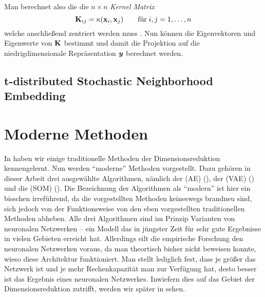 Man berechnet also die die $n \times n$ \textit{Kernel Matrix}
\begin{equation}
	\mathbf{K}_{ij} = \kappa(\mathbf{x}_i, \mathbf{x}_j) \qquad \text{für}\; i,j = 1,\ldots,n
\end{equation}
welche anschließend zentriert werden muss \parencite[598]{Bishop.2006}.
Nun können die Eigenvektoren und Eigenwerte von $\mathbf{K}$ bestimmt und damit die Projektion auf die niedrigdimensionale Repräsentation $\bm{y}$ berechnet werden.







\subsection{t-distributed Stochastic Neighborhood Embedding}
\label{ch:MethodenDerDimRed:traditionell:t-SNE}

\newpage

\section{Moderne Methoden}
\label{ch:MethodenDerDimRed:modern}
In  haben wir einige traditionelle Methoden der Dimensionsreduktion kennengelernt. Nun werden \enquote{moderne} Methoden vorgestellt. Dazu gehören in dieser Arbeit drei ausgewählte Algorithmen, nämlich der  (AE) (), der  (VAE) () und die  (SOM) (). Die Bezeichnung der Algorithmen als \enquote{modern} ist hier ein bisschen irreführend, da die vorgestellten Methoden keineswegs brandneu sind, sich jedoch von der Funktionsweise von den eben vorgestellten traditionellen Methoden abheben. Alle drei Algorithmen sind im Prinzip Varianten von neuronalen Netzwerken -- ein Modell das in jüngster Zeit für sehr gute Ergebnisse in vielen Gebieten erreicht hat. Allerdings eilt die empirische Forschung den neuronalen Netzwerken voraus, da man theortisch bisher nicht beweisen konnte, wieso diese Architektur funktioniert. Man stellt lediglich fest, dass je größer das Netzwerk ist und je mehr Rechenkapazität man zur Verfügung hat, desto besser ist das Ergebnis eines neuronalen Netzwerkes\addref. Inwiefern dies auf das Gebiet der Dimensionsreduktion zutrifft, werden wir später in  sehen.

